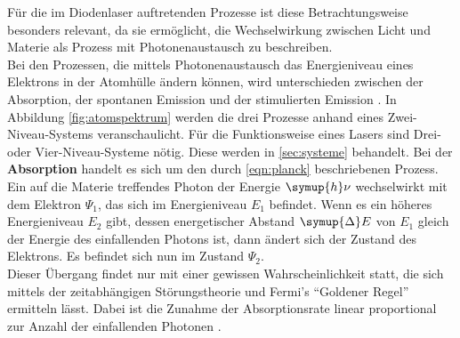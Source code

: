         Für die im Diodenlaser auftretenden Prozesse ist diese Betrachtungsweise besonders relevant, da sie ermöglicht, die Wechselwirkung zwischen Licht und Materie als Prozess mit Photonenaustausch zu beschreiben.
        \\
        Bei den Prozessen, die mittels Photonenaustausch das Energieniveau eines Elektrons in der Atomhülle ändern können, wird unterschieden zwischen der Absorption, der spontanen Emission und der stimulierten Emission \cite[53]{haken_wolf_2004}.
        In Abbildung \autoref{fig:atomspektrum} werden die drei Prozesse anhand eines Zwei-Niveau-Systems veranschaulicht. Für die Funktionsweise eines Lasers sind Drei- oder Vier-Niveau-Systeme nötig. Diese werden in \autoref{sec:systeme} behandelt.
        \FloatBarrier\noindent
        Bei der \textbf{Absorption} handelt es sich um den durch \autoref{eqn:planck} beschriebenen Prozess.
        Ein auf die Materie treffendes Photon der Energie $\symup{h}\nu$ wechselwirkt mit dem Elektron $\Psi_1$, das sich im Energieniveau $E_1$ befindet.
        Wenn es ein höheres Energieniveau $E_2$ gibt, dessen energetischer Abstand $\symup{\Delta}E$ von $E_1$ gleich der Energie des einfallenden Photons ist, dann ändert sich der Zustand des Elektrons.
        Es befindet sich nun im Zustand $\Psi_2$.
        \\
        Dieser Übergang findet nur mit einer gewissen Wahrscheinlichkeit statt, die sich mittels der zeitabhängigen Störungstheorie und Fermi's \enquote{Goldener Regel} ermitteln lässt. 
        Dabei ist die Zunahme der Absorptionsrate linear proportional zur Anzahl der einfallenden Photonen \cite[293]{schwabl}. 
        \\


    
    
